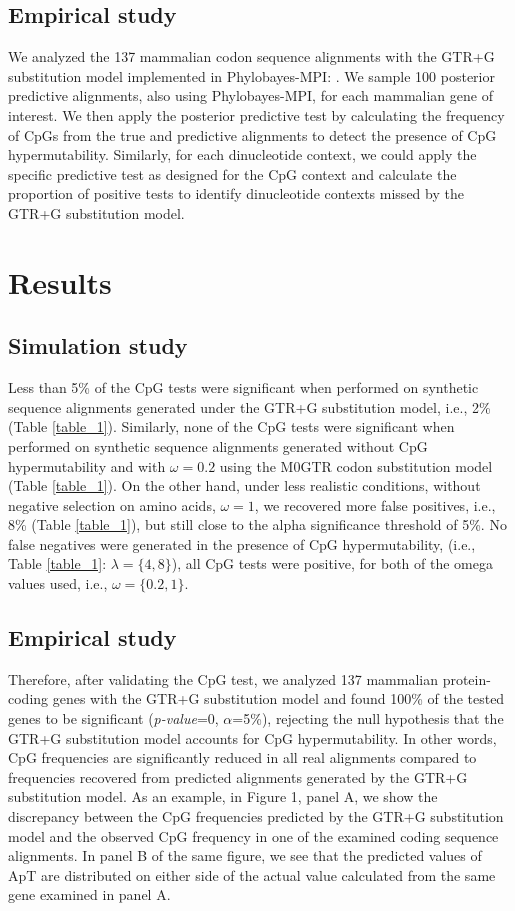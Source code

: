 \documentclass{article}
\begin{document}
\subsection*{Empirical study}
We analyzed the 137 mammalian codon sequence alignments with the GTR+G substitution model implemented in Phylobayes-MPI: \citep{Lartillot2013}.  We sample 100 posterior predictive alignments, also using Phylobayes-MPI, for each mammalian gene of interest.  We then apply the posterior predictive test by calculating the frequency of CpGs from the true and predictive alignments to detect the presence of CpG hypermutability. Similarly, for each dinucleotide context, we could apply the specific predictive test as designed for the CpG context and calculate the proportion of positive tests to identify dinucleotide contexts missed by the GTR+G substitution model.

\section*{Results}
\subsection*{Simulation study}
Less than 5\% of the CpG tests were significant when performed on synthetic sequence alignments generated under the GTR+G substitution model, i.e., 2\% (Table \ref{table_1}).  Similarly, none of the CpG tests were significant when performed on synthetic sequence alignments generated without CpG hypermutability and with $\omega = 0.2$ using the M0GTR codon substitution model (Table \ref{table_1}). On the other hand, under less realistic conditions, without negative selection on amino acids, $\omega=1$, we recovered more false positives, i.e., 8\% (Table \ref{table_1}), but still close to the alpha significance threshold of 5\%. No false negatives were generated in the presence of CpG hypermutability, (i.e., Table \ref{table_1}: $\lambda = \{4,8\}$), all CpG tests were positive, for both of the omega values used, i.e., $\omega = \{0.2, 1\}$.

\subsection*{Empirical study}
Therefore, after validating the CpG test, we analyzed 137 mammalian protein-coding genes with the GTR+G substitution model and found 100\% of the tested genes to be significant (\emph{p-value}=0, $\alpha$=5\%), rejecting the null hypothesis that the GTR+G substitution model accounts for CpG hypermutability.  In other words, CpG frequencies are significantly reduced in all real alignments compared to frequencies recovered from predicted alignments generated by the GTR+G substitution model. As an example, in Figure 1, panel A, we show the discrepancy between the CpG frequencies predicted by the GTR+G substitution model and the observed CpG frequency in one of the examined coding sequence alignments. In panel B of the same figure, we see that the predicted values of ApT are distributed on either side of the actual value calculated from the same gene examined in panel A.
\end{document}
